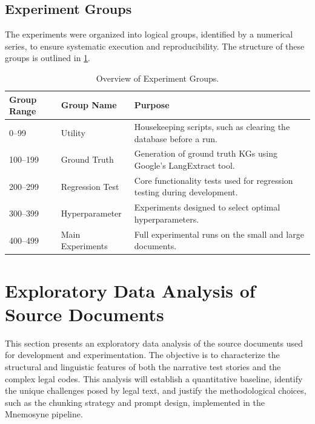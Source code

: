 \subsection{Experiment Groups}
\label{subsec:exp_groups}
The experiments were organized into logical groups, identified by a numerical series, to ensure systematic execution and reproducibility. The structure of these groups is outlined in \cref{tab:exp_groups}.

\begin{table}[!htbp]
\centering
{}
\begin{tabularx}{\textwidth}{@{} ll X @{}} 
\toprule
\textbf{Group Range} & \textbf{Group Name} & \textbf{Purpose} \\ 
\midrule
0--99      & Utility         & Housekeeping scripts, such as clearing the database before a run. \\
100--199   & Ground Truth    & Generation of ground truth KGs using Google's LangExtract tool. \\
200--299   & Regression Test & Core functionality tests used for regression testing during development. \\
300--399   & Hyperparameter  & Experiments designed to select optimal hyperparameters. \\ 
400--499   & Main Experiments& Full experimental runs on the small and large documents. \\ 
\bottomrule
\end{tabularx}
\caption{Overview of Experiment Groups.}
\label{tab:exp_groups}
\end{table}



\section{Exploratory Data Analysis of Source Documents}
This section presents an exploratory data analysis of the source documents used for development and experimentation. The objective is to characterize the structural and linguistic features of both the narrative test stories and the complex legal codes. This analysis will establish a quantitative baseline, identify the unique challenges posed by legal text, and justify the methodological choices, such as the chunking strategy and prompt design, implemented in the Mnemosyne pipeline.

